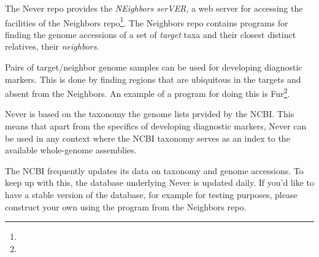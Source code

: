 The Never repo provides the \emph{NEighbors serVER}, a web server for
accessing the facilities of the Neighbors
repo\footnote{}. The Neighbors
repo contains programs for finding the genome accessions of a set of
\emph{target} taxa and their closest distinct relatives, their
\emph{neighbors}.

Pairs of target/neighbor genome samples can be used for developing
diagnostic markers. This is done by finding regions that are
ubiquitous in the targets and absent from the Neighbors. An example of
a program for doing this is
Fur\footnote{}.

Never is based on the taxonomy the genome lists prvided by the
NCBI. This means that apart from the specifics of developing
diagnostic markers, Never can be used in any context where the NCBI
taxonomy serves as an index to the available whole-genome assemblies.

The NCBI frequently updates its data on taxonomy and genome
accessions. To keep up with this, the database underlying Never is
updated daily. If you'd like to have a stable version of the database,
for example for testing purposes, please construct your own using the
program  from the Neighbors repo.
